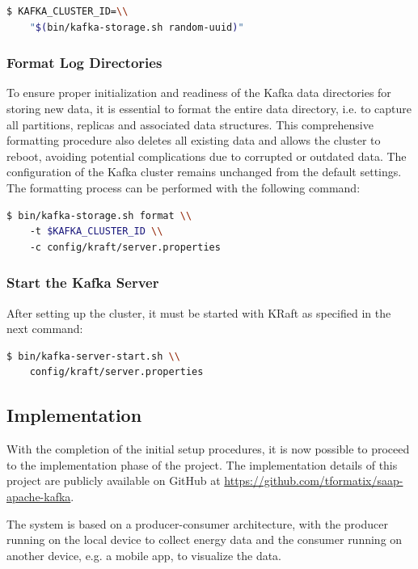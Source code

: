 \begin{lstlisting}[language=bash]
$ KAFKA_CLUSTER_ID=\\
    "$(bin/kafka-storage.sh random-uuid)"
\end{lstlisting}

\subsubsection{Format Log Directories} To ensure proper initialization and readiness of the Kafka data directories for storing new data, it is essential to format the entire data directory, i.e. to capture all partitions, replicas and associated data structures. This comprehensive formatting procedure also deletes all existing data and allows the cluster to reboot, avoiding potential complications due to corrupted or outdated data. The configuration of the Kafka cluster remains unchanged from the default settings. The formatting process can be performed with the following command:

\begin{lstlisting}[language=bash]
$ bin/kafka-storage.sh format \\
    -t $KAFKA_CLUSTER_ID \\
    -c config/kraft/server.properties
\end{lstlisting}

\subsubsection{Start the Kafka Server} After setting up the cluster, it must be started with KRaft as specified in the next command:

\begin{lstlisting}[language=bash]
$ bin/kafka-server-start.sh \\
    config/kraft/server.properties
\end{lstlisting}

\subsection{Implementation}

With the completion of the initial setup procedures, it is now possible to proceed to the implementation phase of the project. The implementation details of this project are publicly available on GitHub at \url{https://github.com/tformatix/saap-apache-kafka}.

The system is based on a producer-consumer architecture, with the producer running on the local device to collect energy data and the consumer running on another device, e.g. a mobile app, to visualize the data.


